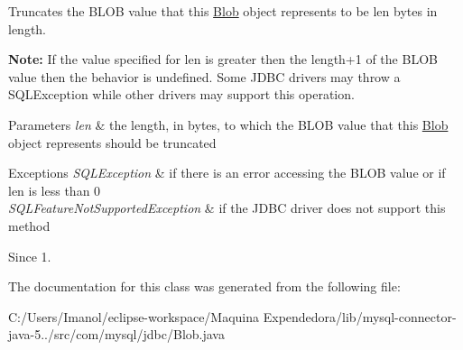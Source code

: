 Truncates the {\ttfamily B\+L\+OB} value that this {\ttfamily \mbox{\hyperlink{classcom_1_1mysql_1_1jdbc_1_1_blob}{Blob}}} object represents to be {\ttfamily len} bytes in length. 

{\bfseries Note\+:} If the value specified for {\ttfamily len} is greater then the length+1 of the {\ttfamily B\+L\+OB} value then the behavior is undefined. Some J\+D\+BC drivers may throw a {\ttfamily S\+Q\+L\+Exception} while other drivers may support this operation.


\begin{DoxyParams}{Parameters}
{\em len} & the length, in bytes, to which the {\ttfamily B\+L\+OB} value that this {\ttfamily \mbox{\hyperlink{classcom_1_1mysql_1_1jdbc_1_1_blob}{Blob}}} object represents should be truncated \\
\hline
\end{DoxyParams}

\begin{DoxyExceptions}{Exceptions}
{\em S\+Q\+L\+Exception} & if there is an error accessing the {\ttfamily B\+L\+OB} value or if len is less than 0 \\
\hline
{\em S\+Q\+L\+Feature\+Not\+Supported\+Exception} & if the J\+D\+BC driver does not support this method \\
\hline
\end{DoxyExceptions}
\begin{DoxySince}{Since}
1. 
\end{DoxySince}


The documentation for this class was generated from the following file\+:\begin{DoxyCompactItemize}
\item 
C\+:/\+Users/\+Imanol/eclipse-\/workspace/\+Maquina Expendedora/lib/mysql-\/connector-\/java-\/5../src/com/mysql/jdbc/Blob.\+java\end{DoxyCompactItemize}
